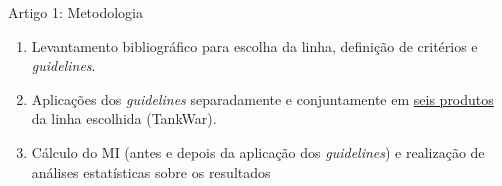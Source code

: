 
\begin{frame}{Artigo 1: Metodologia}
  \begin{enumerate}      
    \item Levantamento bibliográfico para escolha da linha, definição de critérios e \textit{guidelines}.
    \item Aplicações dos \textit{guidelines} separadamente e conjuntamente em \underline{seis produtos} da linha escolhida (TankWar).
    \item Cálculo do MI (antes e depois da aplicação dos \textit{guidelines}) e realização de análises estatísticas sobre os resultados
    
  \end{enumerate} 
\end{frame}